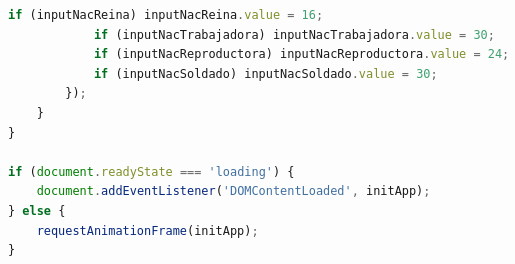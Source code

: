 \documentclass[12pt,a4paper]{article}
\begin{document}
\begin{lstlisting}[language=JavaScript]
            if (inputNacReina) inputNacReina.value = 16;
            if (inputNacTrabajadora) inputNacTrabajadora.value = 30;
            if (inputNacReproductora) inputNacReproductora.value = 24;
            if (inputNacSoldado) inputNacSoldado.value = 30;
        });
    }
}

if (document.readyState === 'loading') {
    document.addEventListener('DOMContentLoaded', initApp);
} else {
    requestAnimationFrame(initApp);
}
\end{lstlisting}
\end{document}
